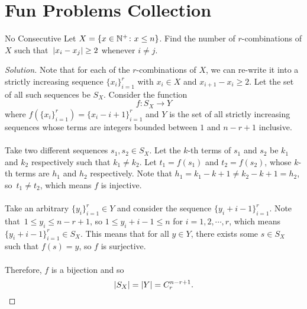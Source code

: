 \documentclass[math]{amznotes}
\theoremstyle{remark}
\newenvironment{solution}
    {\let\oldqedsymbol=\qedsymbol
    \renewcommand{\qedsymbol}{\ }
    \begin{proof}[Solution]
    }
    {\end{proof}
    \renewcommand{\qedsymbol}{\oldqedsymbol}
    }
\begin{document}
\section{Fun Problems Collection}
\begin{genbox}{No Consecutive}
    Let $X = \left\{x \in \mathbb{N}^+ \colon x \leq n\right\}$. Find the number of $r$-combinations of $X$ such that~${\left\lvert {x_i - x_j} \right\rvert} \geq 2$ whenever $i \neq j$.
    \tcblower   
    \begin{solution}
        Note that for each of the $r$-combinations of $X$, we can re-write it into a strictly increasing sequence $\{x_i\}_{i = 1}^r$ with $x_i \in X$ and $x_{i + 1} - x_i \geq 2$. Let the set of all such sequences be $S_X$. Consider the function
        \begin{displaymath}
            f \colon S_X \to Y
        \end{displaymath}
        where $f\left(\{x_i\}_{i = 1}^r\right) = \{x_i - i + 1\}_{i = 1}^r$ and $Y$ is the set of all strictly increasing sequences whose terms are integers bounded between $1$ and $n - r + 1$ inclusive.
        \\\\
        Take two different sequences $s_1, s_2 \in S_X$. Let the $k$-th terms of $s_1$ and $s_2$ be $k_1$ and $k_2$ respectively such that $k_1 \neq k_2$. Let $t_1 = f(s_1)$ and $t_2 = f(s_2)$, whose $k$-th terms are $h_1$ and $h_2$ respectively. Note that $h_1 = k_1 - k + 1 \neq k_2 - k + 1 = h_2$, so~$t_1 \neq t_2$, which means $f$ is injective.
        \\\\
        Take an arbitrary $\{y_i\}_{i = 1}^r \in Y$ and consider the sequence $\{y_i + i - 1\}_{i = 1}^r$. Note that~$1 \leq y_i \leq n - r + 1$, so $1 \leq y_i + i - 1 \leq n$ for $i = 1, 2, \cdots, r$, which means~$\{y_i + i - 1\}_{i = 1}^r \in S_X$. This means that for all $y \in Y$, there exists some $s \in S_X$ such that $f(s) = y$, so $f$ is surjective.
        \\\\
        Therefore, $f$ is a bijection and so
        \begin{equation*}
            {\left\lvert {S_X} \right\rvert} = {\left\lvert {Y} \right\rvert} = C^{n - r + 1}_r.
        \end{equation*}
    \end{solution}
\end{genbox}
\end{document}
